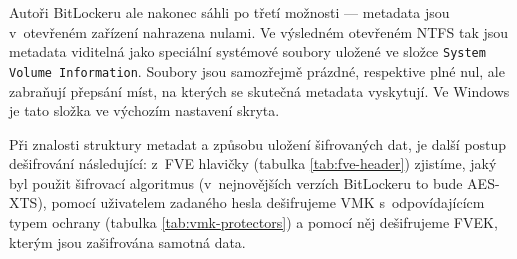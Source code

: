 Autoři BitLockeru ale nakonec sáhli po třetí možnosti --- metadata jsou v~otevřeném zařízení nahrazena nulami. Ve výsledném otevřeném NTFS tak jsou metadata viditelná jako speciální systémové soubory uložené ve složce \texttt{System Volume Information}. Sou\-bo\-ry jsou samozřejmě prázdné, respektive plné nul, ale zabraňují přepsání míst, na kterých se skutečná metadata vyskytují. Ve Windows je tato složka ve výchozím nastavení skryta.


Při znalosti struktury metadat a způsobu uložení šifrovaných dat, je další postup dešifrování následující: z~FVE hlavičky (tabulka \ref{tab:fve-header}) zjistíme, jaký byl použit šifrovací algoritmus (v~nejnovějších verzích BitLockeru to bude AES-XTS), pomocí uživatelem zadaného hesla dešifrujeme VMK s~odpovídajícícm typem ochrany (tabulka \ref{tab:vmk-protectors}) a pomocí něj dešifrujeme FVEK, kterým jsou zašifrována samotná data.

